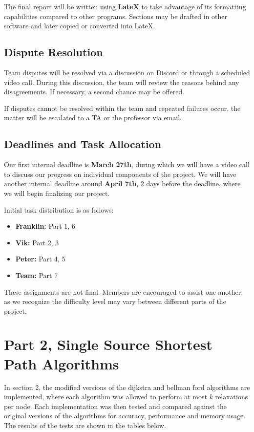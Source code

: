 \documentclass{article}
\begin{document}
\begin{onehalfspace}
{The final report will be written using \textbf{LateX} to take advantage of its formatting capabilities compared to other programs. Sections may be drafted in other software and later copied or converted into LateX.

\subsection*{Dispute Resolution}

Team disputes will be resolved via a discussion on Discord or through a scheduled video call. During this discussion, the team will review the reasons behind any disagreements. If necessary, a second chance may be offered. 

If disputes cannot be resolved within the team and repeated failures occur, the matter will be escalated to a TA or the professor via email.

\subsection*{Deadlines and Task Allocation}

Our first internal deadline is \textbf{March 27th}, during which we will have a video call to discuss our progress on individual components of the project. We will have another internal deadline around \textbf{April 7th}, 2 days before the deadline, where we will begin finalizing our project.

Initial task distribution is as follows:

\begin{itemize}[leftmargin=1.5cm]
    \item \textbf{Franklin:} Part 1, 6
    \item \textbf{Vik:} Part 2, 3
    \item \textbf{Peter:} Part 4, 5
    \item \textbf{Team:} Part 7
\end{itemize}

These assignments are not final. Members are encouraged to assist one another, as we recognize the difficulty level may vary between different parts of the project.}
\newpage

\section*{Part 2, Single Source Shortest Path Algorithms}
In section 2, the modified versions of the dijkstra and bellman ford algorithms are implemented, where each algorithm was allowed to perform at most $k$ relaxations per node. Each implementation
was then tested and compared against the original versions of the algorithms for accuracy, performance and memory usage. The results of the tests are shown in the tables below.


\end{onehalfspace}
\end{document}
